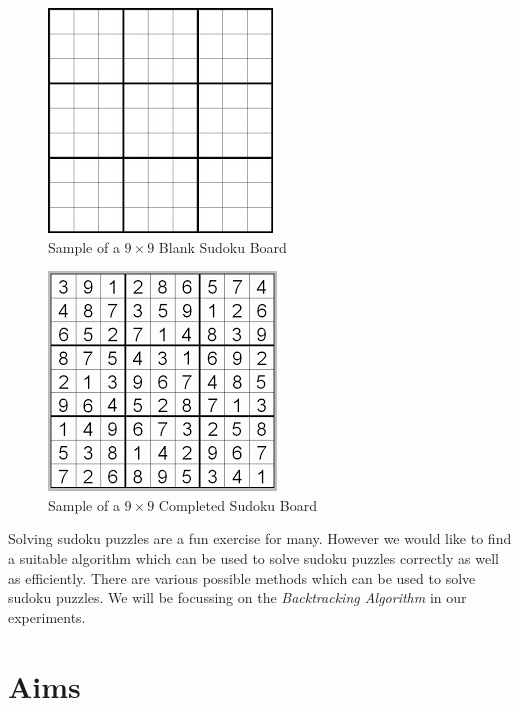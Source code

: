 \documentclass[12pt,a4paper,titlepage]{article}
\begin{document}
\begin{figure}[H]
\centering
\includegraphics[scale=0.5]{Blank_Sudoku_Board}
\caption{Sample of a $9\times9$ Blank Sudoku Board}
\label{fig:Blank_Sudoku_Board}
\end{figure}
\begin{figure}[H]
\centering
\includegraphics[scale=0.5]{Complete_Sudoku_Board}
\caption{Sample of a $9\times9$ Completed Sudoku Board}
\label{fig:Complete_Sudoku_Board}
\end{figure}

\noindent
Solving sudoku puzzles are a fun exercise for many. However we would like to find a suitable algorithm which can be used to solve sudoku puzzles correctly as well as efficiently. There are various possible methods which can be used to solve sudoku puzzles. We will be focussing on the \emph{Backtracking Algorithm} in our experiments.
\\

\newpage
\section{Aims}
\end{document}
